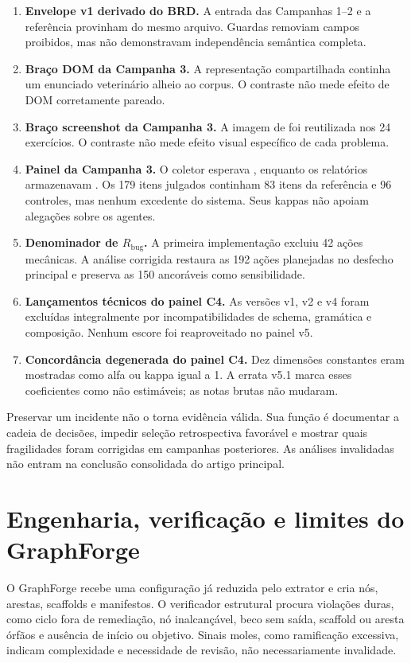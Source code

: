 \documentclass[11pt,a4paper]{article}
\newcommand{\Rbug}{\ensuremath{R_{\mathrm{bug}}}}
\begin{document}
\begin{enumerate}
  \item \textbf{Envelope v1 derivado do BRD.} A entrada das Campanhas 1--2 e a referência provinham do mesmo arquivo. Guardas removiam campos proibidos, mas não demonstravam independência semântica completa.
  \item \textbf{Braço DOM da Campanha 3.} A representação compartilhada continha um enunciado veterinário alheio ao corpus. O contraste não mede efeito de DOM corretamente pareado.
  \item \textbf{Braço screenshot da Campanha 3.} A imagem de  foi reutilizada nos 24 exercícios. O contraste não mede efeito visual específico de cada problema.
  \item \textbf{Painel da Campanha 3.} O coletor esperava , enquanto os relatórios armazenavam . Os 179 itens julgados continham 83 itens da referência e 96 controles, mas nenhum excedente do sistema. Seus kappas não apoiam alegações sobre os agentes.
  \item \textbf{Denominador de \Rbug{}.} A primeira implementação excluiu 42 ações mecânicas. A análise corrigida restaura as 192 ações planejadas no desfecho principal e preserva as 150 ancoráveis como sensibilidade.
  \item \textbf{Lançamentos técnicos do painel C4.} As versões v1, v2 e v4 foram excluídas integralmente por incompatibilidades de schema, gramática e composição. Nenhum escore foi reaproveitado no painel v5.
  \item \textbf{Concordância degenerada do painel C4.} Dez dimensões constantes eram mostradas como alfa ou kappa igual a 1. A errata v5.1 marca esses coeficientes como não estimáveis; as notas brutas não mudaram.
\end{enumerate}

Preservar um incidente não o torna evidência válida. Sua função é documentar a cadeia de decisões, impedir seleção retrospectiva favorável e mostrar quais fragilidades foram corrigidas em campanhas posteriores. As análises invalidadas não entram na conclusão consolidada do artigo principal.

\section{Engenharia, verificação e limites do GraphForge}

O GraphForge recebe uma configuração já reduzida pelo extrator e cria nós, arestas, scaffolds e manifestos. O verificador estrutural procura violações duras, como ciclo fora de remediação, nó inalcançável, beco sem saída, scaffold ou aresta órfãos e ausência de início ou objetivo. Sinais moles, como ramificação excessiva, indicam complexidade e necessidade de revisão, não necessariamente invalidade.
\end{document}
